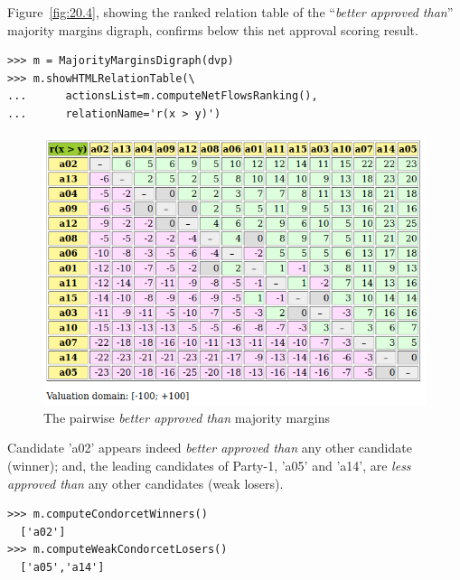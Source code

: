 Figure~\vref{fig:20.4}, showing the \NetFlows ranked relation table of the ``\emph{better approved than}'' majority margins digraph, confirms below this net approval scoring result.
\begin{lstlisting}
>>> m = MajorityMarginsDigraph(dvp)
>>> m.showHTMLRelationTable(\
...      actionsList=m.computeNetFlowsRanking(),
...      relationName='r(x > y)')
\end{lstlisting}	   
\begin{figure}[ht]
\includegraphics[width=\hsize]{Figures/20-4-majMargDAV.png}
\caption{The pairwise \emph{better approved than} majority margins} 
\label{fig:20.4}       %
\end{figure}
Candidate 'a02' appears indeed \emph{better approved than} any other candidate (\Condorcet winner); and, the leading candidates of Party-1, 'a05' and 'a14', are \emph{less approved than} any other candidates (weak \Condorcet losers).
\begin{lstlisting}
>>> m.computeCondorcetWinners()
  ['a02']
>>> m.computeWeakCondorcetLosers()
  ['a05','a14']
\end{lstlisting}

